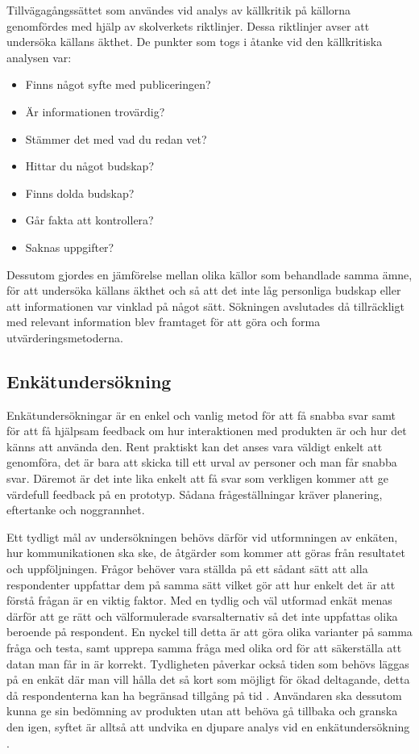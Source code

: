 Tillvägagångssättet som användes vid analys av källkritik på källorna genomfördes med hjälp av skolverkets riktlinjer\cite{GuideKallkritik}. Dessa riktlinjer avser att undersöka källans äkthet. De punkter som togs i åtanke vid den källkritiska analysen var\cite{GuideKallkritik}: 
\begin{itemize}
\item Finns något syfte med publiceringen?
\item Är informationen trovärdig?
\item Stämmer det med vad du redan vet?
\item Hittar du något budskap?
\item Finns dolda budskap?
\item Går fakta att kontrollera?
\item Saknas uppgifter?
\end{itemize}
Dessutom gjordes en jämförelse mellan olika källor som behandlade samma ämne, för att undersöka källans äkthet och så att det inte låg personliga budskap eller att informationen var vinklad på något sätt. Sökningen avslutades då tillräckligt med relevant information blev framtaget för att göra och forma utvärderingsmetoderna. 

\subsection{Enkätundersökning}
Enkätundersökningar är en enkel och vanlig metod för att få snabba svar samt för att få hjälpsam feedback om hur interaktionen med produkten är och hur det känns att använda den. Rent praktiskt kan det anses vara väldigt enkelt att genomföra, det är bara att skicka till ett urval av personer och man får snabba svar\cite{Paloma201499Paloma}. Däremot är det inte lika enkelt att få svar som verkligen kommer att ge värdefull feedback på en prototyp. Sådana frågeställningar kräver planering, eftertanke och noggrannhet\cite{KundKoll2018TipsKundkoll}.
\newline

Ett tydligt mål av undersökningen behövs därför vid utformningen av enkäten, hur kommunikationen ska ske, de åtgärder som kommer att göras från resultatet och uppföljningen. Frågor behöver vara ställda på ett sådant sätt att alla respondenter uppfattar dem på samma sätt vilket gör att hur enkelt det är att förstå frågan är en viktig faktor. Med en tydlig och väl utformad enkät menas därför att ge rätt och välformulerade svarsalternativ så det inte uppfattas olika beroende på respondent. En nyckel till detta är att göra olika varianter på samma fråga och testa, samt upprepa samma fråga med olika ord för att säkerställa att datan man får in är korrekt. Tydligheten påverkar också tiden som behövs läggas på en enkät där man vill hålla det så kort som möjligt för ökad deltagande, detta då respondenterna kan ha begränsad tillgång på tid \cite{Vannette20154Qualtrics}. Användaren ska dessutom kunna ge sin bedömning av produkten utan att behöva gå tillbaka och granska den igen, syftet är alltså att undvika en djupare analys vid en enkätundersökning \cite{Laugwitz2008ConstructionQuestionnaire}. 
\newline

